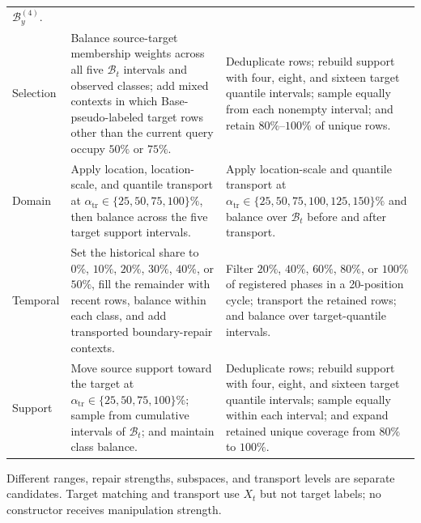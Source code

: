 \begin{longtable}{@{}>{\raggedright\arraybackslash}p{}
                      >{\raggedright\arraybackslash}p{}
                      >{\raggedright\arraybackslash}p{}@{}}
        $\mathcal B_y^{(4)}$. \\
    Selection
      & Balance source-target membership weights across all five
        $\mathcal B_t$ intervals and observed classes; add mixed contexts in
        which Base-pseudo-labeled target rows other than the current query
        occupy $50\%$ or $75\%$.
      & Deduplicate rows; rebuild support with four, eight, and sixteen target
        quantile intervals; sample equally from each nonempty interval; and
        retain $80\%$--$100\%$ of unique rows. \\
    Domain
      & Apply location, location-scale, and quantile transport at
        $\alpha_{\mathrm{tr}}\in\{25,50,75,100\}\%$, then balance across the five target
        support intervals.
      & Apply location-scale and quantile transport at
        $\alpha_{\mathrm{tr}}\in\{25,50,75,100,125,150\}\%$ and balance over
        $\mathcal B_t$ before and after transport. \\
    Temporal
      & Set the historical share to $0\%$, $10\%$, $20\%$, $30\%$, $40\%$, or
        $50\%$, fill the
        remainder with recent rows, balance within each class, and add
        transported boundary-repair contexts.
      & Filter $20\%$, $40\%$, $60\%$, $80\%$, or $100\%$ of registered phases
        in a 20-position cycle; transport the retained rows; and balance over
        target-quantile intervals. \\
    Support
      & Move source support toward the target at
        $\alpha_{\mathrm{tr}}\in\{25,50,75,100\}\%$; sample from cumulative intervals of
        $\mathcal B_t$; and maintain class balance.
      & Deduplicate rows; rebuild support with four, eight, and sixteen target
        quantile intervals; sample equally within each interval; and expand
        retained unique coverage from $80\%$ to $100\%$. \\
  \end{longtable}
\endgroup

Different ranges, repair strengths, subspaces, and transport levels are
separate candidates. Target matching and transport use $X_t$ but not target
labels; no constructor receives manipulation strength.
